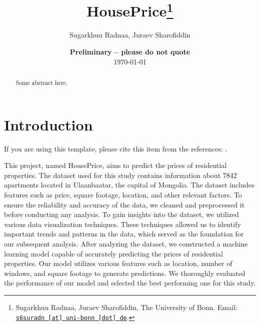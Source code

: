 \documentclass[11pt, a4paper, leqno]{article}
\begin{document}
\title{HousePrice\thanks{Sugarkhuu Radnaa, Juraev Sharofiddin, The University of Bonn. Email: \href{mailto:s6suradn@uni-bonn.de}{\nolinkurl{s6suradn [at] uni-bonn [dot] de}}.}}

\author{Sugarkhuu Radnaa, Juraev Sharofiddin}

\date{
    {\bf Preliminary -- please do not quote}
    \\[1ex]
    \today
}

\maketitle


\begin{abstract}
    Some abstract here.
\end{abstract}

\clearpage


\section{Introduction} %
\label{sec:introduction}

If you are using this template, please cite this item from the references:
\citet{GaudeckerEconProjectTemplates}.

This project, named HousePrice, aims to predict the prices of residential properties.
The dataset used for this study contains information about 7842 apartments located in Ulaanbaatar, the capital of Mongolia.
The dataset includes features such as price, square footage, location, and other relevant factors.
To ensure the reliability and accuracy of the data, we cleaned and preprocessed it before conducting any analysis.
To gain insights into the dataset, we utilized various data visualization techniques.
These techniques allowed us to identify important trends and patterns in the data, which served as the foundation for our subsequent analysis.
After analyzing the dataset, we constructed a machine learning model capable of accurately predicting the prices of residential properties.
Our model utilizes various features such as location, number of windows, and square footage to generate predictions.
We thoroughly evaluated the performance of our model and selected the best performing one for this study.




\end{document}
